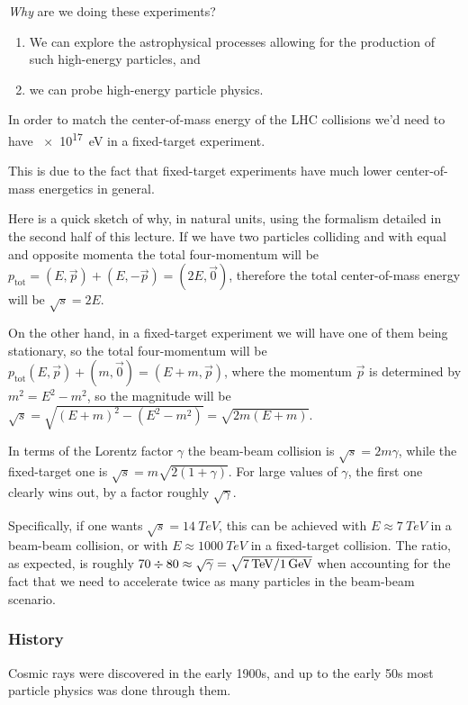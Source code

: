 \documentclass[main.tex]{subfiles}
\begin{document}
\emph{Why} are we doing these experiments?
\begin{enumerate}
    \item We can explore the astrophysical processes allowing for the production of such high-energy particles, and
    \item we can probe high-energy particle physics. 
\end{enumerate}

In order to match the center-of-mass energy of the LHC collisions we'd need to have \SI{e17}{eV} in a fixed-target experiment.

This is due to the fact that fixed-target experiments have much lower center-of-mass energetics in general. 

Here is a quick sketch of why, in natural units, using the formalism detailed in the second half of this lecture.
If we have two particles colliding and with equal and opposite momenta the total four-momentum will be \(p _{\text{tot}} = (E, \vec{p}) + (E, - \vec{p}) = (2E, \vec{0})\), therefore the total center-of-mass energy will be \(\sqrt{s} = 2 E\).

On the other hand, in a fixed-target experiment we will have one of them being stationary, so the total four-momentum will be \(p _{\text{tot}} (E, \vec{p}) + (m, \vec{0}) = (E+m, \vec{p})\), where the momentum \(\vec{p}\) is determined by \(m^2 = E^2 - m^2\), so the magnitude will be \(\sqrt{s} = \sqrt{(E+m)^2 - (E^2 - m^2)} = \sqrt{2m (E+m)}\). 

In terms of the Lorentz factor \(\gamma \) the beam-beam collision is \(\sqrt{s} = 2 m \gamma \), while the fixed-target one is \(\sqrt{s} = m\sqrt{2(1+\gamma )}\). For large values of \(\gamma \), the first one clearly wins out, by a factor roughly \(\sqrt{\gamma }\).

Specifically, if one wants \(\sqrt{s} = \SI{14}{TeV}\), this can be achieved with \(E \approx \SI{7}{TeV}\) in a beam-beam collision, or with \(E \approx \SI{1000}{TeV}\) in a fixed-target collision. 
The ratio, as expected, is roughly \(70 \divisionsymbol 80 \approx \sqrt{\gamma } = \sqrt{\SI{7}{TeV} / \SI{1}{GeV}}\) when accounting for the fact that we need to accelerate twice as many particles in the beam-beam scenario.

\subsubsection*{History}

Cosmic rays were discovered in the early 1900s, and up to the early 50s most particle physics was done through them.
\end{document}
